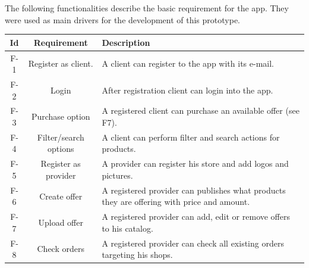 The following functionalities describe the basic requirement for the \gls{app}. They were used as main drivers
for the development of this prototype.

    \begin{tabularx}{\textwidth}{ccX}

    \toprule
    Id & Requirement & Description  \\
    \midrule
    F-1 & Register as \gls{client}. & A \gls{client} can register to the app with its e-mail.\\
    F-2 & Login & After registration \gls{client} can login into the app. \\
    F-3 & Purchase option & A registered \gls{client} can purchase an available offer (see F7).\\
    F-4 & Filter/search options & A \gls{client} can perform filter and search actions for products.\\
    F-5 & Register as \gls{provider} & A \gls{provider} can register his store and add logos and pictures.\\
    F-6 & Create offer & A registered \gls{provider} can publishes what products they are offering with price 
    and amount. \\
    F-7 & Upload offer & A registered \gls{provider} can add, edit or remove offers to his catalog.\\
    F-8 & Check orders & A registered \gls{provider} can check all existing orders targeting his shops.\\
    \bottomrule
    \end{tabularx}

